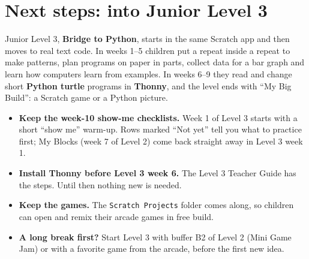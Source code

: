 \documentclass[track=junior,level=2,teacher]{kidscode}
\begin{document}
\section{Next steps: into Junior Level 3}
Junior Level 3, \textbf{Bridge to Python}, starts in the same Scratch app and then moves to real
text code. In weeks 1--5 children put a repeat inside a repeat to make patterns, plan programs on
paper in parts, collect data for a bar graph and learn how computers learn from examples. In weeks
6--9 they read and change short \textbf{Python turtle} programs in \textbf{Thonny}, and the level ends
with \enquote{My Big Build}: a Scratch game or a Python picture.

\begin{itemize}[itemsep=2pt]
  \item \textbf{Keep the week-10 show-me checklists.} Week 1 of Level 3 starts with a short
        \enquote{show me} warm-up. Rows marked \enquote{Not yet} tell you what to practice first;
        My Blocks (week 7 of Level 2) come back straight away in Level 3 week 1.
  \item \textbf{Install Thonny before Level 3 week 6.} The Level 3 Teacher Guide has the steps. Until
        then nothing new is needed.
  \item \textbf{Keep the games.} The \texttt{Scratch Projects} folder comes along, so children can
        open and remix their arcade games in free build.
  \item \textbf{A long break first?} Start Level 3 with buffer B2 of Level 2 (Mini Game Jam) or with a
        favorite game from the arcade, before the first new idea.
\end{itemize}
\end{document}
